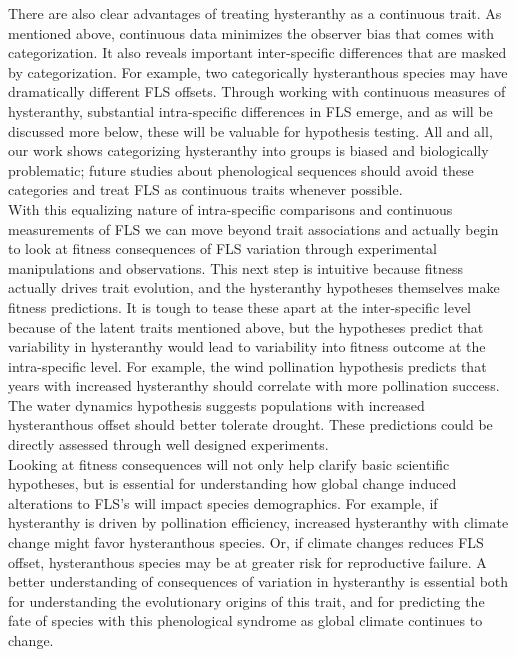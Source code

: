 \documentclass[12pt]{article}\usepackage[]{graphicx}\usepackage[]{color}
\begin{document}
\indent There are also clear advantages of treating hysteranthy as a continuous trait. As mentioned above, continuous data minimizes the observer bias that comes with categorization. It also reveals important inter-specific differences that are masked by categorization. For example, two categorically hysteranthous species may have dramatically different FLS offsets. Through working with continuous measures of hysteranthy, substantial intra-specific differences in FLS emerge, and as will be discussed more below, these will be valuable for hypothesis testing. All and all, our work shows categorizing hysteranthy into groups is biased and biologically problematic; future studies about phenological sequences should avoid these categories and treat FLS as continuous traits whenever possible.\\
\indent With this equalizing nature of intra-specific comparisons and continuous measurements of FLS we can move beyond trait associations and actually begin to look at fitness consequences of FLS variation through experimental manipulations and observations. This next step is intuitive because fitness actually drives trait evolution, and the hysteranthy hypotheses themselves make fitness predictions. It is tough to tease these apart at the inter-specific level because of the latent traits mentioned above, but the hypotheses predict that variability in hysteranthy would lead to variability into fitness outcome at the intra-specific level. For example, the wind pollination hypothesis predicts that years with increased hysteranthy should correlate with more pollination success. The water dynamics hypothesis suggests populations with increased hysteranthous offset should better tolerate drought. These predictions could be directly assessed through well designed experiments.\\
\indent Looking at fitness consequences will not only help clarify basic scientific hypotheses, but is essential for understanding how global change induced alterations to FLS's will impact species demographics. For example, if hysteranthy is driven by pollination efficiency, increased hysteranthy with climate change might favor hysteranthous species. Or, if climate changes reduces FLS offset, hysteranthous species may be at greater risk for reproductive failure. A better understanding of consequences of variation in hysteranthy is essential both for understanding the evolutionary origins of this trait, and for predicting the fate of species with this phenological syndrome as global climate continues to change.
\end{document}
